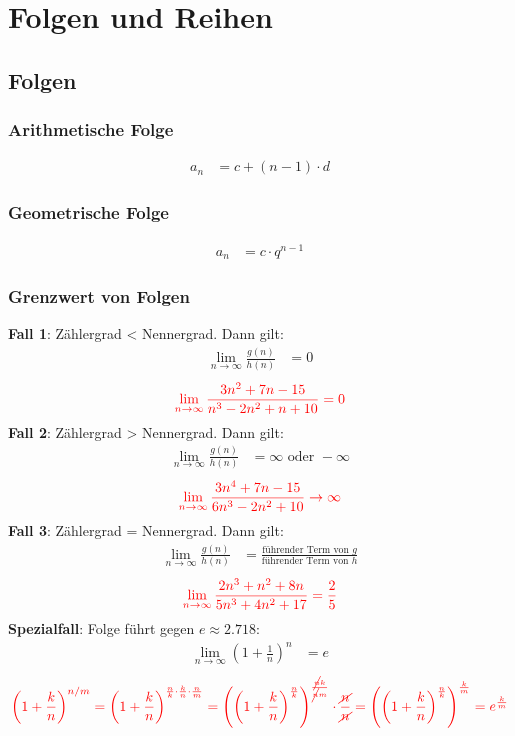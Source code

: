 \section{Folgen und Reihen}
\subsection{Folgen}
\subsubsection{Arithmetische Folge}
\begin{align*}
	a_n & = c + (n-1) \cdot d
\end{align*}
\subsubsection{Geometrische Folge}
\begin{align*}
	a_n & = c \cdot q^{n-1}
\end{align*}

\subsubsection{Grenzwert von Folgen}
\textbf{Fall 1}: Zählergrad < Nennergrad. Dann gilt:
\begin{align*}
	\lim_{n \to \infty} \frac{g(n)}{h(n)} & = 0
\end{align*}
\begin{align*}
	\textcolor{red}{\lim_{n \to \infty} \frac{3n^2 + 7n - 15}{n^3 - 2n^2 + n + 10} = 0}
\end{align*}
\textbf{Fall 2}: Zählergrad > Nennergrad. Dann gilt:
\begin{align*}
	\lim_{n \to \infty} \frac{g(n)}{h(n)} & = \infty \text{ oder } -\infty
\end{align*}
\begin{align*}
	\textcolor{red}{\lim_{n \to \infty} \frac{3n^4 + 7n - 15}{6n^3 - 2n^2 + 10} \to \infty}
\end{align*}
\textbf{Fall 3}: Zählergrad = Nennergrad. Dann gilt:
\begin{align*}
	\lim_{n \to \infty} \frac{g(n)}{h(n)} & = \frac{\text{führender Term von } g}{\text{führender Term von } h}
\end{align*}
\begin{align*}
	\textcolor{red}{\lim_{n \to \infty} \frac{2n^3 + n^2 + 8n}{5n^3 + 4n^2 + 17} = \frac{2}{5}}
\end{align*}
\textbf{Spezialfall}: Folge führt gegen $e \approx 2.718$:
\begin{align*}
	\lim_{n \to \infty} (1+\frac{1}{n})^n & = e
\end{align*}
\begin{align*}
	\textcolor{red}{\left(1 + \frac{k}{n}\right)^{n/m} = \left(1 + \frac{k}{n}\right)^{\frac{n}{k} \cdot \frac{k}{n} \cdot \frac{n}{m}} = \left(\left(1 + \frac{k}{n}\right)^{\frac{n}{k}}\right)^{\frac{\cancel{n}k}{\cancel{n}m}} \cdot \frac{\cancel{n}}{\cancel{n}} = \left(\left(1 + \frac{k}{n}\right)^{\frac{n}{k}}\right)^{\frac{k}{m}} = e^{\frac{k}{m}}}
\end{align*}

